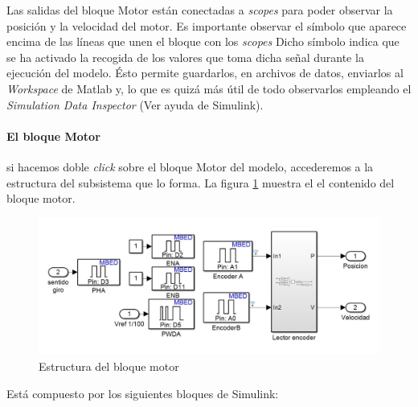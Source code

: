 \documentclass[10pt,a4paper]{report}
\begin{document}
Las salidas del bloque Motor están conectadas a \emph{scopes} para poder observar la posición y la velocidad del motor. Es importante observar el símbolo que aparece encima de las líneas que unen el bloque con los \emph{scopes} Dicho símbolo  indica que se ha activado la recogida de los valores que toma dicha señal durante la ejecución del modelo. Ésto permite guardarlos, en archivos de datos, enviarlos al \emph{Workspace} de Matlab y, lo que es quizá más útil de todo observarlos empleando el \emph{Simulation Data Inspector} (Ver ayuda de Simulink).
 
\paragraph{El bloque Motor}
si hacemos doble \emph{click} sobre el bloque Motor del modelo, accederemos a la estructura del subsistema que lo forma. La figura \ref{f19} muestra el el contenido del bloque motor.
\begin{figure}
\includegraphics[width=\textwidth]{la2.jpg}
\caption{Estructura del bloque motor}\label{f19}
\end{figure}
Está compuesto por los siguientes bloques de Simulink:
\end{document}
